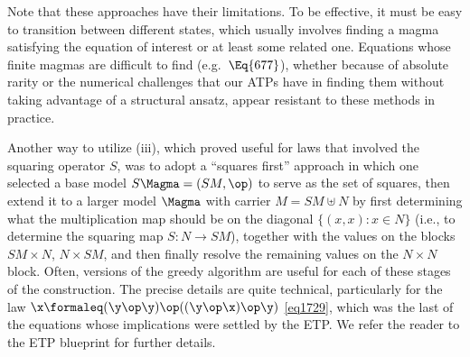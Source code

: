 Note that these approaches have their limitations.  To be effective, it must be easy to transition between different
states, which usually involves finding a magma satisfying the equation of interest or at least some related one.
Equations whose finite magmas are difficult to find (e.g.\ $\Eq{677}$), whether because of absolute rarity or the numerical challenges
that our ATPs have in finding them without taking advantage of a structural ansatz, appear resistant to these methods in practice.

Another way to utilize (iii), which proved useful for laws that involved the squaring operator $S$, was to adopt a ``squares first'' approach in which one selected a base model $S\Magma = (SM,\op)$ to serve as the set of squares, then extend it to a larger model $\Magma$ with carrier $M = SM \uplus N$ by first determining what the multiplication map should be on the diagonal $\{ (x,x): x\in N\}$ (i.e., to determine the squaring map $S \colon N \to SM$), together with the values on the blocks $SM \times N$, $N \times SM$, and then finally resolve the remaining values on the $N \times N$ block.  Often, versions of the greedy algorithm are useful for each of these stages of the construction.  The precise details are quite technical, particularly for the law $\x \formaleq (\y \op \y) \op ((\y \op \x) \op \y)$ \eqref{eq1729}, which was the last of the equations whose implications were settled by the ETP.  We refer the reader to the ETP blueprint for further details.
